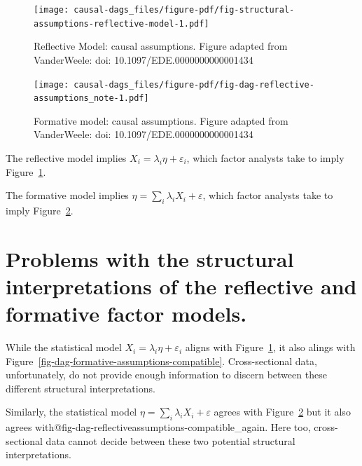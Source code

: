 \documentclass[
  singlecolumn]{report}
\begin{document}
\begin{figure}

{\centering \texttt{[image: causal-dags\_files/figure-pdf/fig-structural-assumptions-reflective-model-1.pdf]}

}

\caption{\label{fig-structural-assumptions-reflective-model}Reflective
Model: causal assumptions. Figure adapted from VanderWeele: doi:
10.1097/EDE.0000000000001434}

\end{figure}

\begin{figure}

{\centering \texttt{[image: causal-dags\_files/figure-pdf/fig-dag-reflective-assumptions\_note-1.pdf]}

}

\caption{\label{fig-dag-reflective-assumptions_note}Formative model:
causal assumptions. Figure adapted from VanderWeele: doi:
10.1097/EDE.0000000000001434}

\end{figure}

The reflective model implies \(X_i = \lambda_i \eta + \varepsilon_i\),
which factor analysts take to imply
Figure~\ref{fig-structural-assumptions-reflective-model}.

The formative model implies
\(\eta = \sum_i\lambda_i X_i + \varepsilon\), which factor analysts take
to imply Figure~\ref{fig-dag-reflective-assumptions_note}.

\hypertarget{problems-with-the-structural-interpretations-of-the-reflective-and-formative-factor-models.}{%
\section{Problems with the structural interpretations of the reflective
and formative factor
models.}\label{problems-with-the-structural-interpretations-of-the-reflective-and-formative-factor-models.}}

While the statistical model \(X_i = \lambda_i \eta + \varepsilon_i\)
aligns with Figure~\ref{fig-structural-assumptions-reflective-model}, it
also alings with Figure~\ref{fig-dag-formative-assumptions-compatible}.
Cross-sectional data, unfortunately, do not provide enough information
to discern between these different structural interpretations.

Similarly, the statistical model
\(\eta = \sum_i\lambda_i X_i + \varepsilon\) agrees with
Figure~\ref{fig-dag-reflective-assumptions_note} but it also agrees
with@fig-dag-reflectiveassumptions-compatible\_again. Here too,
cross-sectional data cannot decide between these two potential
structural interpretations.
\end{document}
